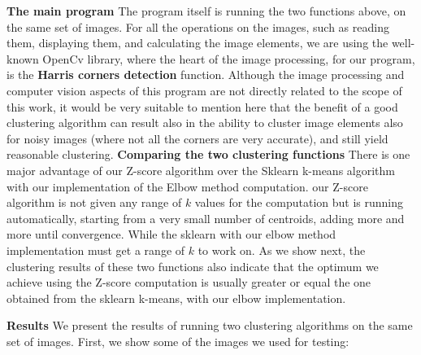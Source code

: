 \documentclass[12pt]{article}
\begin{document}
\textbf{The main program} \newline
The program itself is running the two functions above, on the same set of images. \newline
For all the operations on the images, such as reading them, displaying them, and calculating the image elements, we are using the well-known OpenCv library,
where the heart of the image processing, for our program, is the \textbf{Harris corners detection} function. \newline
Although the image processing and computer vision aspects of this program are not directly related to the scope of this work, it would be very suitable to mention here that the benefit of a good clustering algorithm can result also in the ability to cluster image elements also for noisy images (where not all the corners are very accurate), and still yield reasonable clustering.
\newline \newline
\textbf{Comparing the two clustering 
 functions} \newline
There is one major advantage of our Z-score algorithm over the Sklearn k-means algorithm with our implementation of the Elbow method computation. \newline 
our Z-score algorithm is not given any range of $k$ values for the computation but is running automatically, starting from a very small number of centroids, adding more and more until convergence. \newline
While the sklearn with our elbow method implementation must get a range of $k$ to work on.
As we show next, the clustering results of these two functions also indicate that the optimum we achieve using the Z-score computation is usually greater or equal the one obtained from the sklearn k-means, with our elbow implementation.
 
\newpage
\textbf{Results} \newline
We present the results of running two clustering algorithms on the same set of images. First, we show some of the images we used for testing: \newline
\newline
\end{document}
